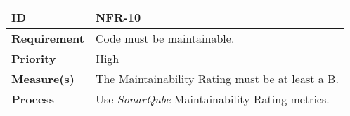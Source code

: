\begin{center}
\begin{tabular}{ | m{8em} | m{25em}| } 
 \hline
 \textbf{ID} & NFR-10\\ 
 \hline
 \textbf{Requirement} & Code must be maintainable. \\
 \hline
 \textbf{Priority} & High \\
 \hline
 \textbf{Measure(s)} & The Maintainability Rating must be at least a B.\\
 \hline
 \textbf{Process} & Use \textit{SonarQube} Maintainability Rating metrics. \\
 \hline
\end{tabular}
\end{center}
